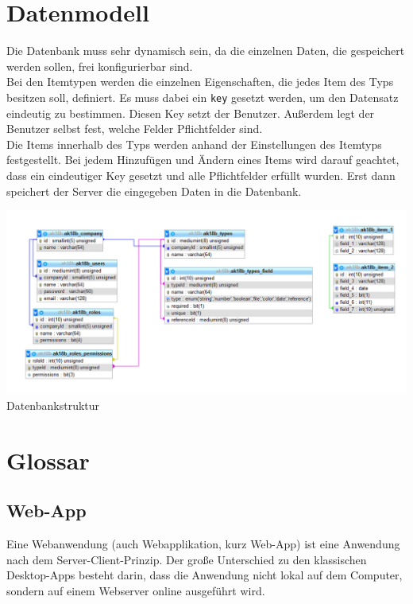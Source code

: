 \documentclass[11pt,a4paper]{report}
\begin{document}
	\section{Datenmodell}
	Die Datenbank muss sehr dynamisch sein, da die einzelnen Daten, die gespeichert werden sollen, frei konfigurierbar sind.\\
	Bei den Itemtypen werden die einzelnen Eigenschaften, die jedes Item des Typs besitzen soll, definiert. 
	Es muss dabei ein \texttt{key} gesetzt werden, um den Datensatz eindeutig zu bestimmen. 
	Diesen Key setzt der Benutzer. 
	Außerdem legt der Benutzer selbst fest, welche Felder Pflichtfelder sind.\\
	Die Items innerhalb des Typs werden anhand der Einstellungen des Itemtyps festgestellt. 
	Bei jedem Hinzufügen und Ändern eines Items wird darauf geachtet, dass ein eindeutiger Key gesetzt und alle Pflichtfelder erfüllt wurden. 
	Erst dann speichert der Server die eingegeben Daten in die Datenbank.\\
	
	\begin{center}
		\includegraphics[scale=0.4]{database.png}\\
		Datenbankstruktur
	\end{center}
	
	\newpage	
	
	\section{Glossar}
	
	\subsection*{Web-App}
	Eine Webanwendung (auch Webapplikation, kurz Web-App) ist eine Anwendung nach dem Server-Client-Prinzip. 
	Der große Unterschied zu den klassischen Desktop-Apps besteht darin, dass die Anwendung nicht lokal auf dem Computer, sondern auf einem Webserver online ausgeführt wird.
	
\end{document}
